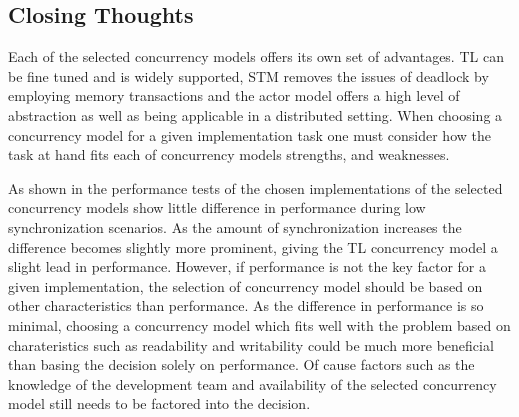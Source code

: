 




\subsection{Closing Thoughts}
Each of the selected concurrency models offers its own set of advantages. \ac{TL} can be fine tuned and is widely supported, \ac{STM} removes the issues of deadlock by employing memory transactions and the actor model offers a high level of abstraction as well as being applicable in a distributed setting. When choosing a concurrency model for a given implementation task one must consider how the task at hand fits each of concurrency models strengths, and weaknesses.

As shown in the performance tests of  the chosen implementations of the selected concurrency models show little difference in performance during low synchronization scenarios. As the amount of synchronization increases the difference becomes slightly more prominent, giving the \ac{TL} concurrency model a slight lead in performance. However, if performance is not the key factor for a given implementation, the selection of concurrency model should be based on other characteristics than performance. As the difference in performance is so minimal, choosing a concurrency model which fits well with the problem based on charateristics such as readability and writability could be much more beneficial than basing the decision solely on performance. Of cause factors such as the knowledge of the development team and availability of the selected concurrency model still needs to be factored into the decision.

